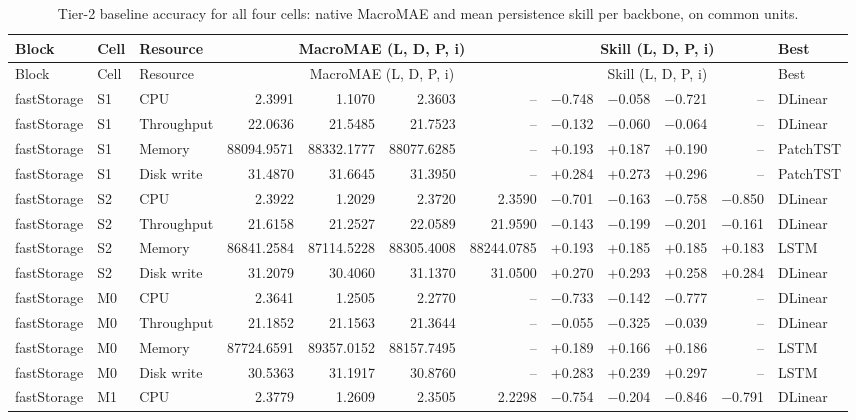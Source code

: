 \documentclass[a4paper,11pt]{article}
\begin{document}
\scriptsize
\setlength{\tabcolsep}{3pt}
\begin{longtable}{@{}lllrrrrrrrrl@{}}
\caption{Tier-2 baseline accuracy for all four cells: native MacroMAE and mean persistence skill per backbone, on common units.}\label{tab:supp-t2-baseline}\\
\toprule
Block & Cell & Resource & \multicolumn{4}{c}{MacroMAE (L, D, P, i)} & \multicolumn{4}{c}{Skill (L, D, P, i)} & Best \\
\midrule
\endfirsthead
\toprule
Block & Cell & Resource & \multicolumn{4}{c}{MacroMAE (L, D, P, i)} & \multicolumn{4}{c}{Skill (L, D, P, i)} & Best \\
\midrule
\endhead
\bottomrule
\endfoot
fastStorage & S1 & CPU & 2.3991 & 1.1070 & 2.3603 & -- & $-$0.748 & $-$0.058 & $-$0.721 & -- & DLinear \\
fastStorage & S1 & Throughput & 22.0636 & 21.5485 & 21.7523 & -- & $-$0.132 & $-$0.060 & $-$0.064 & -- & DLinear \\
fastStorage & S1 & Memory & 88094.9571 & 88332.1777 & 88077.6285 & -- & +0.193 & +0.187 & +0.190 & -- & PatchTST \\
fastStorage & S1 & Disk write & 31.4870 & 31.6645 & 31.3950 & -- & +0.284 & +0.273 & +0.296 & -- & PatchTST \\
fastStorage & S2 & CPU & 2.3922 & 1.2029 & 2.3720 & 2.3590 & $-$0.701 & $-$0.163 & $-$0.758 & $-$0.850 & DLinear \\
fastStorage & S2 & Throughput & 21.6158 & 21.2527 & 22.0589 & 21.9590 & $-$0.143 & $-$0.199 & $-$0.201 & $-$0.161 & DLinear \\
fastStorage & S2 & Memory & 86841.2584 & 87114.5228 & 88305.4008 & 88244.0785 & +0.193 & +0.185 & +0.185 & +0.183 & LSTM \\
fastStorage & S2 & Disk write & 31.2079 & 30.4060 & 31.1370 & 31.0500 & +0.270 & +0.293 & +0.258 & +0.284 & DLinear \\
fastStorage & M0 & CPU & 2.3641 & 1.2505 & 2.2770 & -- & $-$0.733 & $-$0.142 & $-$0.777 & -- & DLinear \\
fastStorage & M0 & Throughput & 21.1852 & 21.1563 & 21.3644 & -- & $-$0.055 & $-$0.325 & $-$0.039 & -- & DLinear \\
fastStorage & M0 & Memory & 87724.6591 & 89357.0152 & 88157.7495 & -- & +0.189 & +0.166 & +0.186 & -- & LSTM \\
fastStorage & M0 & Disk write & 30.5363 & 31.1917 & 30.8760 & -- & +0.283 & +0.239 & +0.297 & -- & LSTM \\
fastStorage & M1 & CPU & 2.3779 & 1.2609 & 2.3505 & 2.2298 & $-$0.754 & $-$0.204 & $-$0.846 & $-$0.791 & DLinear \\

\end{longtable}
\end{document}
